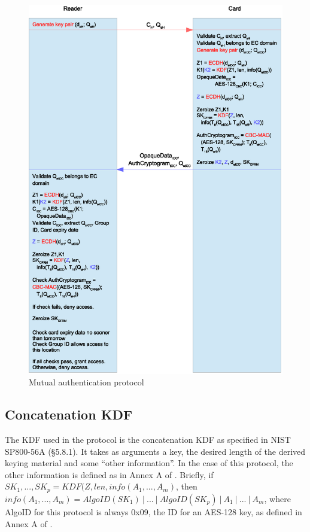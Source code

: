 \documentclass[12pt,a4paper,twoside,openright]{report}
\begin{document}
\begin{figure}[tbh]
\centerline{\includegraphics[scale=0.8]{figures/mutualauth.eps}}
\caption{Mutual authentication protocol}
\label{fig:mutualauth}
\end{figure}

\subsection{Concatenation KDF}

The KDF used in the protocol is the concatenation KDF as specified in NIST SP800-56A \cite{nistsp80056a} (\S5.8.1). It takes as arguments a key, the desired length of the derived keying material and some ``other information''. In the case of this protocol, the other information is defined as in Annex A of \cite{OPACITY}. Briefly, if $SK_1, ..., SK_p =  KDF(Z, len, info(A_1, ..., A_m)$, then $info(A_1, ..., A_m) = AlgoID(SK_1)~\vert~...~\vert~AlgoID(SK_p)~\vert~A_1~\vert~...~\vert~A_m$, where AlgoID for this protocol is always 0x09, the ID for an AES-128 key, as defined in Annex A of \cite{OPACITY}.
\end{document}
